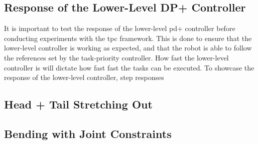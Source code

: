 \subsection*{Response of the Lower-Level DP+ Controller}
It is important to test the response of the lower-level \gls{pd+} controller before
conducting experiments with the \gls{tpc} framework. This is done to ensure that
the lower-level controller is working as expected, and that the robot is able to
follow the references set by the task-priority controller. How fast the
lower-level controller is will dictate how fast fast the tasks can be executed.
To showcase the response of the lower-level controller, step responses 

\subsection*{Head + Tail Stretching Out}

\subsection*{Bending with Joint Constraints}

